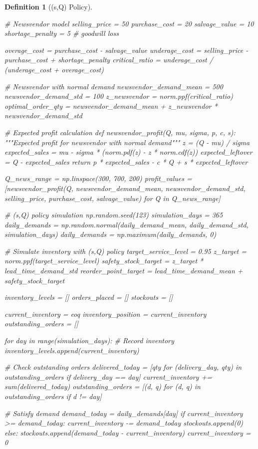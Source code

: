 \documentclass[a4paper, 11pt]{article}
\newtheorem{definition}{Definition}[section]
\begin{document}
\begin{definition}[(s,Q) Policy]
\begin{pycode}
# Newsvendor model
selling_price = 50
purchase_cost = 20
salvage_value = 10
shortage_penalty = 5  # goodwill loss

overage_cost = purchase_cost - salvage_value
underage_cost = selling_price - purchase_cost + shortage_penalty
critical_ratio = underage_cost / (underage_cost + overage_cost)

# Newsvendor with normal demand
newsvendor_demand_mean = 500
newsvendor_demand_std = 100
z_newsvendor = norm.ppf(critical_ratio)
optimal_order_qty = newsvendor_demand_mean + z_newsvendor * newsvendor_demand_std

# Expected profit calculation
def newsvendor_profit(Q, mu, sigma, p, c, s):
    """Expected profit for newsvendor with normal demand"""
    z = (Q - mu) / sigma
    expected_sales = mu - sigma * (norm.pdf(z) - z * norm.cdf(z))
    expected_leftover = Q - expected_sales
    return p * expected_sales - c * Q + s * expected_leftover

Q_news_range = np.linspace(300, 700, 200)
profit_values = [newsvendor_profit(Q, newsvendor_demand_mean, newsvendor_demand_std,
                                   selling_price, purchase_cost, salvage_value)
                 for Q in Q_news_range]

# (s,Q) policy simulation
np.random.seed(123)
simulation_days = 365
daily_demands = np.random.normal(daily_demand_mean, daily_demand_std, simulation_days)
daily_demands = np.maximum(daily_demands, 0)

# Simulate inventory with (s,Q) policy
target_service_level = 0.95
z_target = norm.ppf(target_service_level)
safety_stock_target = z_target * lead_time_demand_std
reorder_point_target = lead_time_demand_mean + safety_stock_target

inventory_levels = []
orders_placed = []
stockouts = []

current_inventory = eoq
inventory_position = current_inventory
outstanding_orders = []

for day in range(simulation_days):
    # Record inventory
    inventory_levels.append(current_inventory)

    # Check outstanding orders
    delivered_today = [qty for (delivery_day, qty) in outstanding_orders if delivery_day == day]
    current_inventory += sum(delivered_today)
    outstanding_orders = [(d, q) for (d, q) in outstanding_orders if d != day]

    # Satisfy demand
    demand_today = daily_demands[day]
    if current_inventory >= demand_today:
        current_inventory -= demand_today
        stockouts.append(0)
    else:
        stockouts.append(demand_today - current_inventory)
        current_inventory = 0


\end{pycode}
\end{definition}
\end{document}
